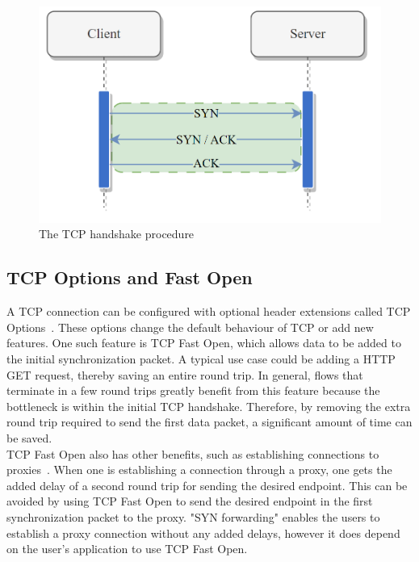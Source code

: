 \documentclass[a4paper,english, 12pt]{report}
\begin{document}
\begin{figure} %
	\centering
	\includegraphics[scale=0.75]{../diagrams/drawio/tcphandshake.png}
  	\caption{The TCP handshake procedure}
  	\label{fig:tcphandshake}
\end{figure}

\subsection{TCP Options and Fast Open}
A TCP connection can be configured with optional header extensions called TCP Options~\cite{tcp_options}. These options change the default behaviour of TCP or add new features. One such feature is TCP Fast Open, which allows data to be added to the initial synchronization packet. A typical use case could be adding a HTTP GET request, thereby saving an entire round trip. In general, flows that terminate in a few round trips greatly benefit from this feature because the bottleneck is within the initial TCP handshake. Therefore, by removing the extra round trip required to send the first data packet, a significant amount of time can be saved.\\

TCP Fast Open also has other benefits, such as establishing connections to proxies~\cite{rfc8803}. When one is establishing a connection through a proxy, one gets the added delay of a second round trip for sending the desired endpoint. This can be avoided by using TCP Fast Open to send the desired endpoint in the first synchronization packet to the proxy. "SYN forwarding" enables the users to establish a proxy connection without any added delays, however it does depend on the user's application to use TCP Fast Open.
\end{document}
